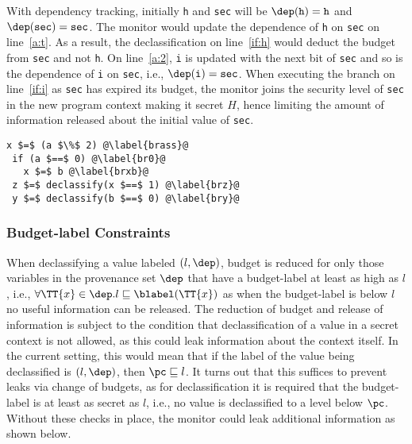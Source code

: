 With dependency tracking, initially \texttt{h} and \texttt{sec} will
be $\dep(\texttt{h}) = \texttt{h}$ and $\dep(\texttt{sec}) = \texttt{sec}$.
The monitor would update the dependence of \texttt{h} on
\texttt{sec} on line~\ref{a:t}. As a result, the declassification on
line~\ref{if:h} would deduct the budget from \texttt{sec} and not
\texttt{h}. On line~\ref{a:2}, \texttt{i} is updated with the next bit
of \texttt{sec} and so is the dependence of \texttt{i} on
\texttt{sec}, i.e., $\dep(\texttt{i}) = \texttt{sec}$. When executing
the branch on line~\ref{if:i} as \texttt{sec} has expired its budget,
the monitor joins the security level of \texttt{sec} in the new
program context making it secret $H$, hence limiting the amount of
information released about the initial value of \texttt{sec}. 

\begin{lstlisting}[float,caption=Example to illustrate budget reduction,label=egbr]
 x $=$ (a $\%$ 2) @\label{brass}@
 if (a $==$ 0) @\label{br0}@
   x $=$ b @\label{brxb}@
 z $=$ declassify(x $==$ 1) @\label{brz}@
 y $=$ declassify(b $==$ 0) @\label{bry}@
\end{lstlisting}
\subsubsection{Budget-label Constraints}
When declassifying a value labeled $(l, \dep)$, budget is reduced
for only those variables in the provenance set $\dep$ that have a
budget-label at least as high as $l$, i.e., $\forall \TT{x} \in \dep. l
\sqsubseteq \blabel(\TT{x})$ as when the budget-label is below $l$ no 
useful information can be released. 
The reduction of budget and release of information is subject to the 
condition that declassification of a value in a secret context is not
allowed, as this could leak information about the context itself. In
the current setting, this would mean that if the label of the value
being declassified is $(l, \dep)$, then $\pc \sqsubseteq l$. It
turns out that this suffices to prevent leaks via change of budgets,
as for declassification it is required that the budget-label is at
least as secret as $l$, i.e., no value is declassified to a level
below $\pc$. Without these checks in place, the monitor could leak
additional information as shown below.

